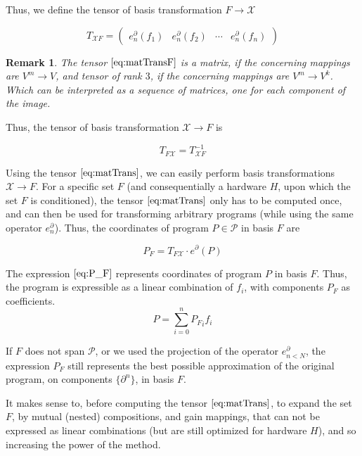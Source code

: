 \documentclass{article}
\newcommand{\X}{\mathcal{X}}
\newcommand{\dP}{\mathcal{P}}
\newcommand{\D}{\partial}
\newtheorem{opomba}{Remark}[section]
\begin{document}
  Thus, we define the tensor of basis transformation $F\to\X$
  
  \begin{equation}\label{eq:matTransF}
  T_{\X F}=\begin{pmatrix}
  e_n^\D(f_1) & e_n^\D(f_2) & \cdots & e_n^\D(f_n)
  \end{pmatrix}
  \end{equation}
  
  \begin{opomba}
  The tensor $\eqref{eq:matTransF}$ is a matrix, if the concerning mappings are $V^m\to V$, and tensor of rank $3$, if the concerning mappings are $V^m\to V^k$. Which can be interpreted as a sequence of matrices, one for each component of the image.
  \end{opomba}
  
  Thus, the tensor of basis transformation $\X\to F$ is
  
  \begin{equation}\label{eq:matTrans}
  T_{F\X}=T_{\X F}^{-1}
  \end{equation}
  
  Using the tensor $\eqref{eq:matTrans}$, we can easily perform basis transformations $\X\to F$. For a specific set $F$ (and consequentially a hardware $H$, upon which the set $F$ is conditioned), the tensor $\eqref{eq:matTrans}$ only has to be computed once, and can then be used for transforming arbitrary programs (while using the same operator $e^\D_n$).
  Thus, the coordinates of program $P\in\dP$ in basis $F$ are
  
  \begin{equation}\label{eq:P_F}
  	P_F=T_{F\X}\cdot e^\D(P)
  \end{equation}
  
  The expression $\eqref{eq:P_F}$ represents coordinates of program $P$ in basis $F$. Thus, the program is expressible as a linear combination of $f_i$, with components $P_F$ as coefficients.
  \begin{equation}
  P=\sum\limits_{i=0}^{n}{P_F}_if_i
  \end{equation}
  
  If $F$ does not span $\dP$, or we used the projection of the operator $e^\D_{n<N}$, the expression $P_F$ still represents the best possible approximation of the original program, on components $\{\D^n\}$, in basis $F$.
  
  It makes sense to, before computing the tensor $\eqref{eq:matTrans}$, to expand the set $F$, by mutual (nested) compositions, and gain mappings, that can not be expressed as linear combinations (but are still optimized for hardware $H$), and so increasing the power of the method.
  
\end{document}
